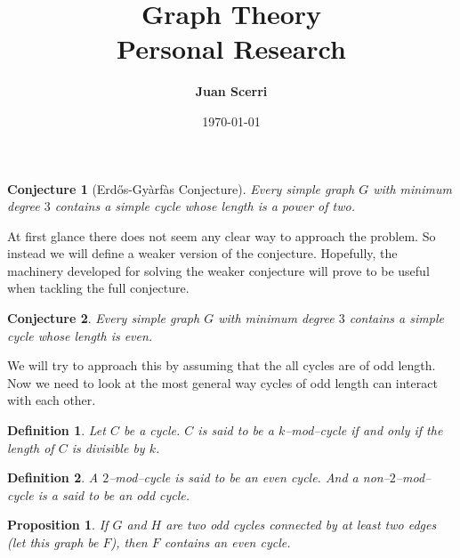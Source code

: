 \documentclass[12pt]{article}
\title{Graph Theory\\
\vspace{0.75em}\textbf{Personal Research}}
\date{\today}
\author{\textbf{Juan Scerri}}
\theoremstyle{plain}
\newtheorem{prop}{Proposition}
\newtheorem{conj}{Conjecture}
\newtheorem{defn}{Definition}
\begin{document}
\maketitle %

\thispagestyle{empty} %

\begin{conj}[Erd\H os-Gy\` arf\` as Conjecture]

Every simple graph $G$ with minimum degree $3$ contains a simple
cycle whose length is a power of two.

\end{conj}

At first glance there does not seem any clear way to approach
the problem. So instead we will define a weaker version of the
conjecture. Hopefully, the machinery developed for solving the
weaker conjecture will prove to be useful when tackling the full
conjecture.


\begin{figure}[H]
\centering

\end{figure}

\begin{conj}

Every simple graph $G$ with minimum degree $3$ contains a simple
cycle whose length is even.

\end{conj}

We will try to approach this by assuming that the all cycles are
of odd length. Now we need to look at the most general way
cycles of odd length can interact with each other.

\begin{defn}
Let $C$ be a cycle. $C$ is said to be a $k$--mod--cycle if and
only if the length of $C$ is divisible by $k$.
\end{defn}

\begin{defn}
A $2$--mod--cycle is said to be an even cycle. And a
non--$2$--mod--cycle is a said to be an odd cycle. 
\end{defn}

\begin{prop}\label{edge-connected-cycles}
If $G$ and $H$ are two odd cycles connected by at least two
edges (let this graph be $F$), then $F$ contains an even cycle. 
\end{prop}
\end{document}
